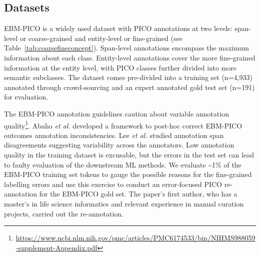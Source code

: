 \documentclass[10.7pt,]{article}
\begin{document}
\subsection{Datasets}\label{data}
%
EBM-PICO is a widely used dataset with PICO annotations at two levels: span-level or coarse-grained and entity-level or fine-grained (see Table~\ref{tab:coarsefineconcept}).
Span-level annotations encompass the maximum information about each class.
Entity-level annotations cover the more fine-grained information at the entity level, with PICO classes further divided into more semantic subclasses.
The dataset comes pre-divided into a training set (n=4,933) annotated through crowd-sourcing and an expert annotated gold test set (n=191) for evaluation.\cite{nye2018corpus}

The EBM-PICO annotation guidelines caution about variable annotation quality\footnote{\url{https://www.ncbi.nlm.nih.gov/pmc/articles/PMC6174533/bin/NIHMS988059-supplement-Appendix.pdf}}.
Abaho \textit{et al.} developed a framework to post-hoc correct EBM-PICO outcomes annotation inconsistencies.\cite{abaho2019correcting}
Lee \textit{et al.} studied annotation span disagreements suggesting variability across the annotators.\cite{lee2019study}
Low annotation quality in the training dataset is excusable, but the errors in the test set can lead to faulty evaluation of the downstream ML methods.
We evaluate \textasciitilde1\% of the EBM-PICO training set tokens to gauge the possible reasons for the fine-grained labelling errors and use this exercise to conduct an error-focused PICO re-annotation for the EBM-PICO gold set.
The paper's first author, who has a master's in life science informatics and relevant experience in manual curation projects, carried out the re-annotation.
\end{document}
